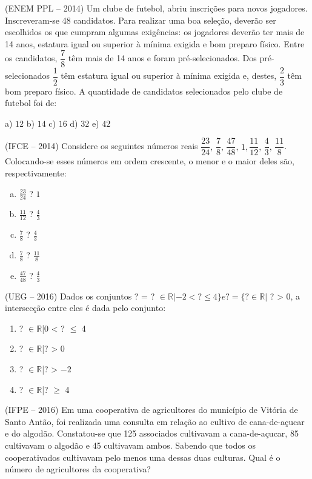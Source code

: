 \begin{multicols*}{2}
\begin{enumerate}[(a)]
	\end{enumerate}

	\execnum (ENEM PPL  --  2014) Um clube de futebol, abriu inscrições para novos jogadores. Inscreveram-se 48 candidatos. Para realizar uma boa seleção, deverão ser escolhidos os que cumpram algumas exigências: os jogadores deverão ter mais de 14 anos, estatura igual ou superior à mínima exigida e bom preparo físico. Entre os candidatos, $\dfrac{7}{8}$ têm mais de 14 anos e foram pré-selecionados. Dos pré-selecionados $\dfrac{1}{2}$ têm estatura igual ou superior à mínima exigida e, destes, $\dfrac{2}{3}$ têm bom preparo físico. A quantidade de candidatos selecionados pelo clube de futebol foi de:

	a) $12 $ b) $14 $ c) $16 $ d) $32 $ e) $42 $

	\execnum (IFCE -- 2014) Considere os seguintes números reais $\dfrac{23}{24},\, \dfrac{7}{8},\, \dfrac{47}{48},\, 1, \dfrac{11}{12},\, \dfrac{4}{3},\, \dfrac{11}{8} $. Colocando-se esses números em ordem crescente, o menor e o maior deles são, respectivamente:

	\begin{enumerate}[(a)]

		\item $ \frac{23}{24}$ ? $ 1 $
		\item $ \frac{11}{12}$ ? $ \frac{4}{3} $
		\item $ \frac{7}{8}$ ? $ \frac{4}{3} $
		\item $ \frac{7}{8}$ ? $ \frac{11}{8} $
		\item $ \frac{47}{48}$ ? $ \frac{4}{3} $

	\end{enumerate}

	\execnum (UEG -- 2016) Dados os conjuntos ? = {? $\in \mathbb{R}|-2 <  ?  \leq 4\} e ? = \{? \in \mathbb{R}|$ ? > 0}, a intersecção entre eles é dada pelo conjunto:

	\begin{enumerate}

		\item {? $\in \mathbb{R}$|0 < ? $\leq$ 4}
		\item {? $\in \mathbb{R}$|? > 0}
		\item {? $\in \mathbb{R}$|? > $ -2 $}
		\item {? $\in \mathbb{R}$|? $\geq$ 4}

	\end{enumerate}

	\execnum (IFPE -- 2016) Em uma cooperativa de agricultores do município de Vitória de Santo Antão, foi realizada uma consulta em relação ao cultivo de cana-de-açucar e do algodão. Constatou-se que 125 associados cultivavam a cana-de-açucar, 85 cultivavam o algodão e 45 cultivavam ambos. Sabendo que todos os cooperativados cultivavam pelo menos uma dessas duas culturas. Qual é o número de agricultores da cooperativa?


\end{multicols*}
